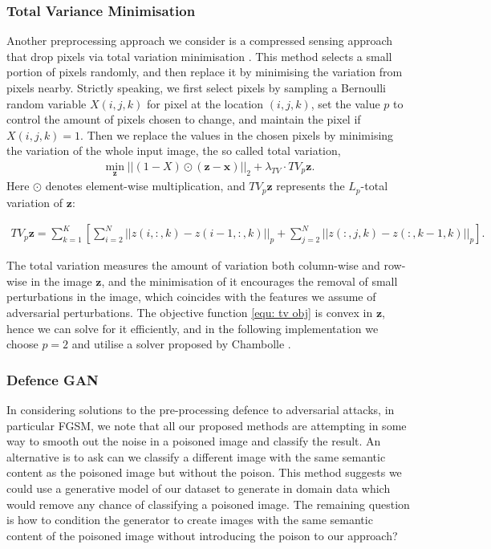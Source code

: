 \subsubsection{Total Variance Minimisation} 
Another preprocessing approach we consider is a compressed sensing approach that drop pixels via total variation minimisation \cite{Rudin:1992:NTV:142273.142312}. This method selects a small portion of pixels randomly, and then replace it by minimising the variation from pixels nearby. Strictly speaking, we first select pixels by sampling a Bernoulli random variable $X(i,j,k)$ for pixel at the location $(i,j,k)$, set the value $p$ to control the amount of pixels chosen to change, and maintain the pixel if $X(i,j,k) = 1$. Then we replace the values in the chosen pixels by minimising the variation of the whole input image, the so called total variation, 
\begin{align}
	\min_{\mathbf{z}}||(1 - X) \odot (\mathbf{z} - \mathbf{x})||_2 + \lambda_{TV}\cdot TV_p{\mathbf{z}}.
	\label{equ: tv obj}
\end{align}
Here $\odot$ denotes element-wise multiplication, and $TV_p{\mathbf{z}}$ represents the $L_p$-total variation of $\mathbf{z}$:

\begin{align}
	TV_p{\mathbf{z}} = \sum_{k = 1}^{K}\left[\sum_{i=2}^{N}||z(i,:,k) - z(i-1, :, k)||_p + \sum_{j = 2}^{N}||z(:,j,k) - z(:,k-1,k)||_p\right].
\end{align}

The total variation measures the amount of variation both column-wise and row-wise in the image $\mathbf{z}$, and the minimisation of it encourages the removal of small perturbations in the image, which coincides with the features we assume of adversarial perturbations. The objective function \ref{equ: tv obj} is convex in $\mathbf{z}$, hence we can solve for it efficiently, and in the following implementation we choose $p = 2$ and utilise a solver proposed by Chambolle \cite{Chambolle:2004:ATV:964969.964985}. 


\subsubsection{Defence GAN}
In considering solutions to the pre-processing defence to adversarial attacks, in particular FGSM, we note that all our proposed methods are attempting in some way to smooth out the noise in a poisoned image and classify the result. An alternative is to ask can we classify a different image with the same semantic content as the poisoned image but without the poison.  This method suggests we could use a generative model of our dataset to generate in domain data which would remove any chance of classifying a poisoned image.  The remaining question is how to condition the generator to create images with the same semantic content of the poisoned image without introducing the poison to our approach?


